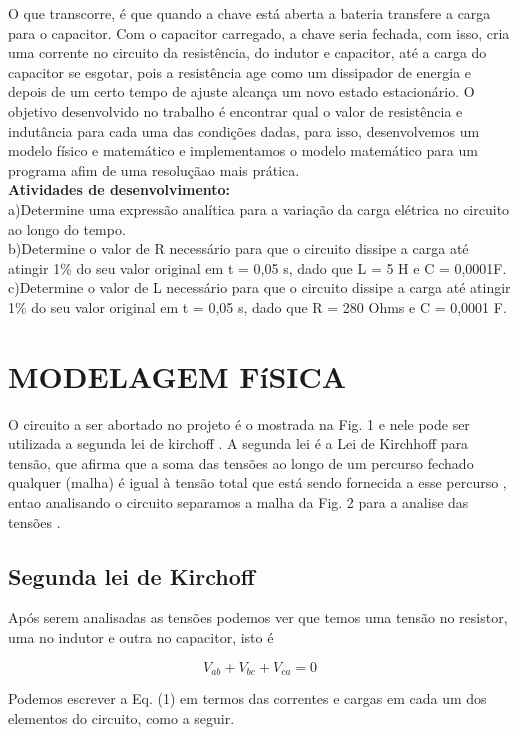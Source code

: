 \documentclass[12pt,fleqn]{article}
\begin{document}
O que transcorre, é que quando a chave está aberta a bateria transfere a carga para o capacitor. Com o capacitor carregado, a chave seria fechada, com isso, cria uma corrente no circuito da resistência, do indutor e capacitor, até a carga do capacitor se esgotar, pois a resistência age como um dissipador de energia e depois de um certo tempo de ajuste alcança um novo estado estacionário. O objetivo desenvolvido no trabalho é encontrar qual o valor de resistência e indutância para cada uma das condições dadas, para isso, desenvolvemos um modelo físico e matemático e implementamos o modelo matemático para um programa afim de uma resoluçãao mais prática.\\

\textbf{Atividades de desenvolvimento:}\\
a)Determine uma expressão analítica para a variação da carga elétrica no circuito ao longo do tempo.\\
b)Determine o valor de R necessário para que o circuito dissipe a carga até atingir 1\% do seu valor original em t = 0,05 s, dado que L = 5 H e C = 0,0001F.\\
c)Determine o valor de L necessário para que o circuito dissipe a carga até atingir 1\% do seu valor original em t = 0,05 s, dado que R = 280 Ohms e C = 0,0001 F.

\section{MODELAGEM FíSICA}
O circuito a ser abortado no projeto é o mostrada na Fig. 1 e nele pode ser utilizada a segunda lei de kirchoff \cite{gussow2009eletricidade}. A segunda lei é a Lei de Kirchhoff para tensão, que afirma que a soma das tensões ao longo de um percurso fechado qualquer (malha) é igual à tensão total que está sendo fornecida a esse percurso , entao analisando o circuito separamos a malha da Fig. 2 para a analise das tensões \cite{dos2018caderno}.
\newpage %
\subsection{Segunda lei de Kirchoff}
 Após serem analisadas as tensões podemos ver que temos uma tensão no resistor, uma no indutor e outra no capacitor, isto é

\begin{equation}
V_{ab}+V_{bc}+V_{ca}=0
\label{eq}
\end{equation}

Podemos escrever a Eq. (1) em termos das correntes e cargas em cada um dos elementos do circuito, como a seguir.
\end{document}
